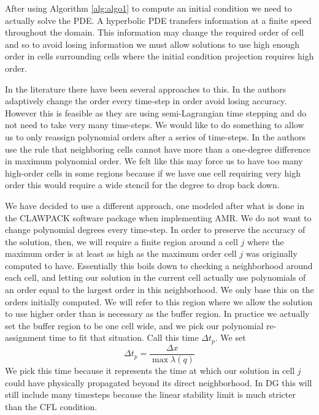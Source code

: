 \documentclass[10]{amsart}
\begin{document}
After using Algorithm \ref{alg:algo1} to
compute an initial condition we need to actually solve the PDE. A hyperbolic PDE transfers information at a finite
speed throughout the domain. This information may change the required order of cell and so to avoid losing information we
must allow solutions to use high enough order in cells surrounding cells where the initial condition projection requires high
order. 

In the literature there have been several approaches to this. In \cite{tumolo2013semi} the authors adaptively change
the order every time-step in order avoid losing accuracy. However this is feasible as they are using semi-Lagrangian time
stepping and do not need to take very many time-steps. We would like to do something to allow us to only reassign polynomial
orders after a series of time-steps. In \cite{eskilsson2011hp} the authors use the rule that neighboring cells
cannot have more than a one-degree difference in maximum polynomial order. We felt like this may force us to have
too many high-order cells in some regions because if we have one cell requiring very high order this would require
a wide stencil for the degree to drop back down.

We have decided to use a different approach, one modeled after what is done in the CLAWPACK software package
when implementing AMR. We do not want to change polynomial degrees every time-step. In order to preserve the accuracy
of the solution, then, we will require a finite region around a cell $j$ where the maximum order is at least
as high as the maximum order cell $j$ was originally computed to have.
Essentially this boils down to checking a neighborhood around each cell, and letting our solution in the current
cell actually use polynomials of an order equal to the largest order in this neighborhood. We only base
this on the orders initially computed. We will refer to this region where
we allow the solution to use higher order than is necessary as the buffer region. In practice we actually
set the buffer region to be one cell wide, and we pick our polynomial re-assignment time to fit that situation.
Call this time $\Delta t_p$. We set 
$$\Delta t_p=\frac{\Delta x }{\max \lambda(q)}$$
We pick this time because it represents the time at which our solution in cell $j$ could have physically propagated
beyond its direct neighborhood. 
In DG this will still include many timesteps because the linear stability limit is much stricter than the CFL condition.
\end{document}
